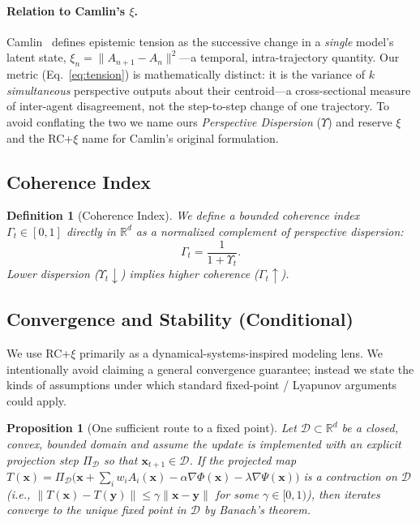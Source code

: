 \documentclass[11pt,a4paper]{article}
\newcommand{\rcxi}{RC+$\xi$}
\newtheorem{definition}{Definition}
\newtheorem{proposition}{Proposition}
\begin{document}
\paragraph{Relation to Camlin's $\xi$.}
Camlin~\citep{camlin2025consciousness} defines epistemic tension as the
successive change in a \emph{single} model's latent state,
$\xi_n = \| A_{n+1} - A_n \|^2$---a temporal, intra-trajectory quantity. Our
metric (Eq.~\ref{eq:tension}) is mathematically distinct: it is the variance of
$k$ \emph{simultaneous} perspective outputs about their centroid---a
cross-sectional measure of inter-agent disagreement, not the step-to-step
change of one trajectory. To avoid conflating the two we name ours
\emph{Perspective Dispersion} ($\Upsilon$) and reserve $\xi$ and the \rcxi{}
name for Camlin's original formulation.

\subsection{Coherence Index}

\begin{definition}[Coherence Index]
We define a bounded coherence index $\Gamma_t \in [0,1]$ directly in
$\mathbb{R}^d$ as a normalized complement of perspective dispersion:
\begin{equation}
\label{eq:coherence}
\Gamma_t = \frac{1}{1 + \Upsilon_t}.
\end{equation}
Lower dispersion ($\Upsilon_t\downarrow$) implies higher coherence
($\Gamma_t\uparrow$).
\end{definition}

\subsection{Convergence and Stability (Conditional)}

We use RC+$\xi$ primarily as a dynamical-systems-inspired modeling lens.
We intentionally avoid claiming a general convergence guarantee; instead we
state the kinds of assumptions under which standard fixed-point / Lyapunov
arguments could apply.

\begin{proposition}[One sufficient route to a fixed point]
\label{prop:convergence}
Let $\mathcal{D} \subset \mathbb{R}^d$ be a closed, convex, bounded domain
and assume the update is implemented with an explicit projection step
$\Pi_{\mathcal{D}}$ so that $\mathbf{x}_{t+1} \in \mathcal{D}$. If the
projected map $T(\mathbf{x}) = \Pi_{\mathcal{D}}\!\big(\mathbf{x} +
\sum_i w_i A_i(\mathbf{x}) - \alpha\nabla\Phi(\mathbf{x}) -
\lambda\nabla\Psi(\mathbf{x})\big)$ is a contraction on $\mathcal{D}$
(i.e., $\|T(\mathbf{x})-T(\mathbf{y})\|\le\gamma\|\mathbf{x}-\mathbf{y}\|$
for some $\gamma\in[0,1)$), then iterates converge to the unique fixed point
in $\mathcal{D}$ by Banach's theorem.
\end{proposition}
\end{document}
